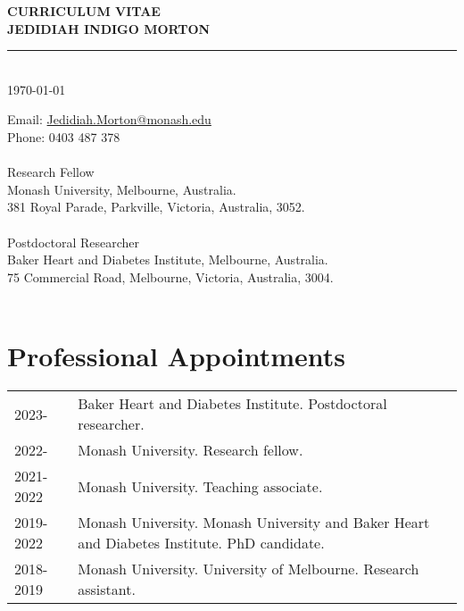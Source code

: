 \documentclass[11pt]{article}
\newcommand{\thedate}{\today}
\begin{document}
\begin{titlepage}
    \begin{center}
        \Huge
        \textbf{CURRICULUM VITAE \\
JEDIDIAH INDIGO MORTON}
\rule{16cm}{2mm} \\
\Large
\thedate \\
       \vfill
    \end{center}
        \Large

\noindent
Email: \color{blue}
 \href{mailto:Jedidiah.Morton@Monash.edu}{Jedidiah.Morton@monash.edu} \\
\color{black}
Phone: \color{blue} 0403 487 378 \\
\color{black}
 \\
Research Fellow \\
Monash University, Melbourne, Australia. \\
381 Royal Parade, Parkville, Victoria, Australia, 3052. \\
 \\
Postdoctoral Researcher \\
Baker Heart and Diabetes Institute, Melbourne, Australia. \\
75 Commercial Road, Melbourne, Victoria, Australia, 3004. \\
\\
\end{titlepage}

\tableofcontents


\color{white}
\cite{AbebeNeu2024,
DoodyAGG2024,
MacPE2024,
MortonDRCP2024,
TanCPT2024,
tanDRCP2024,
LivoriIJC2024,
LivoriEJPC2023,
MacCO2024,
FelekeDRCP2023,
LordPPT2023,
AbebeEHJ2023,
MortonPECA2023,
MortonAJKD2023,
DoodyAGG2023,
MacCirc2023,
DinaPE2023,
LloydDLOGIA2023,
MortonVIH2023,
TomicDRCP2023,
LazzDLOGIA2023,
QuigleyDRCP2022,
MacVIH2022,
MortonDLOGIA2023,
TomicDRCP2022,
TomicLDE2022,
MortonEJPC2023,
AdemiPE2022,
MortonDRCP2022,
MortonDM2022b,
MortonJECH2022,
OyunTAEM2022,
RuizDLOGIA2022,
MortonDC2022,
MortonJONS2022,
HastingsPE2022,
MortonDM2022a,
HardingNDT2022,
OyunSR2021,
MortonDC2021,
MortonDLOGIA2021,
MortonDC2020}
\color{black}
\pagebreak


\section*{Professional Appointments}

\begin{tabular}{p{2cm}p{14cm}}
2023- & Baker Heart and Diabetes Institute. Postdoctoral researcher. \\
2022- & Monash University. Research fellow. \\
2021-2022 & Monash University. Teaching associate. \\
2019-2022 & Monash University. Monash University and Baker Heart and Diabetes Institute. PhD candidate. \\
2018-2019 & Monash University. University of Melbourne. Research assistant. \\
\end{tabular}
\end{document}
